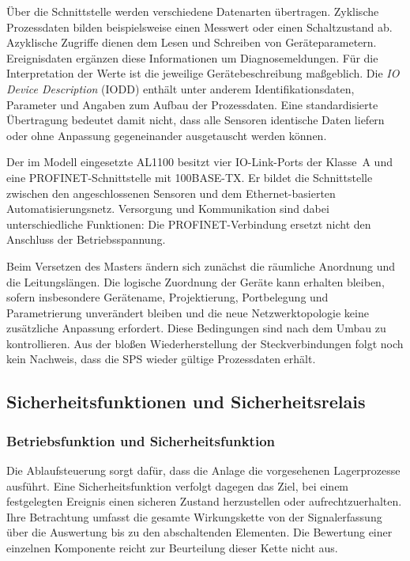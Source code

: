 Über die Schnittstelle werden verschiedene Datenarten übertragen. Zyklische Prozessdaten bilden beispielsweise einen Messwert oder einen Schaltzustand ab. Azyklische Zugriffe dienen dem Lesen und Schreiben von Geräteparametern. Ereignisdaten ergänzen diese Informationen um Diagnosemeldungen. Für die Interpretation der Werte ist die jeweilige Gerätebeschreibung maßgeblich. Die \emph{IO Device Description} (IODD) enthält unter anderem Identifikationsdaten, Parameter und Angaben zum Aufbau der Prozessdaten. Eine standardisierte Übertragung bedeutet damit nicht, dass alle Sensoren identische Daten liefern oder ohne Anpassung gegeneinander ausgetauscht werden können. \cite{ifm_iolink_technik}

Der im Modell eingesetzte AL1100 besitzt vier IO-Link-Ports der Klasse~A und eine PROFINET-Schnittstelle mit 100BASE-TX. Er bildet die Schnittstelle zwischen den angeschlossenen Sensoren und dem Ethernet-basierten Automatisierungsnetz. Versorgung und Kommunikation sind dabei unterschiedliche Funktionen: Die PROFINET-Verbindung ersetzt nicht den Anschluss der Betriebsspannung. \cite{ifm_al1100_datenblatt_2024}

Beim Versetzen des Masters ändern sich zunächst die räumliche Anordnung und die Leitungslängen. Die logische Zuordnung der Geräte kann erhalten bleiben, sofern insbesondere Gerätename, Projektierung, Portbelegung und Parametrierung unverändert bleiben und die neue Netzwerktopologie keine zusätzliche Anpassung erfordert. Diese Bedingungen sind nach dem Umbau zu kontrollieren. Aus der bloßen Wiederherstellung der Steckverbindungen folgt noch kein Nachweis, dass die SPS wieder gültige Prozessdaten erhält.

\subsection{Sicherheitsfunktionen und Sicherheitsrelais}
\label{sec:grundlagen_sicherheit}

\subsubsection{Betriebsfunktion und Sicherheitsfunktion}

Die Ablaufsteuerung sorgt dafür, dass die Anlage die vorgesehenen Lagerprozesse ausführt. Eine Sicherheitsfunktion verfolgt dagegen das Ziel, bei einem festgelegten Ereignis einen sicheren Zustand herzustellen oder aufrechtzuerhalten. Ihre Betrachtung umfasst die gesamte Wirkungskette von der Signalerfassung über die Auswertung bis zu den abschaltenden Elementen. Die Bewertung einer einzelnen Komponente reicht zur Beurteilung dieser Kette nicht aus. \cite[Kap.~6--7]{ifa_report_2025}

